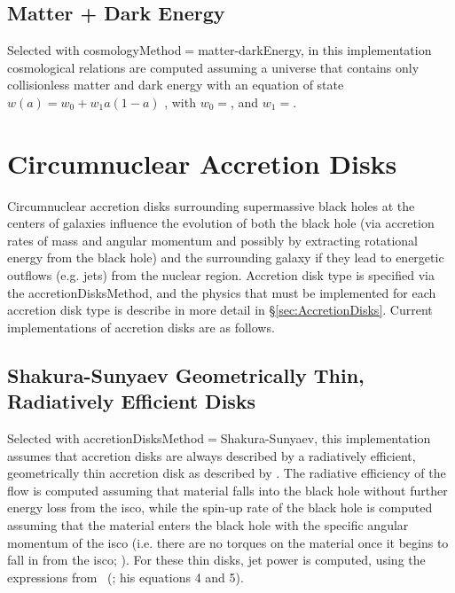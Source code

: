 \subsection{Matter + Dark Energy}\label{phys:cosmologyFunctions:cosmologyFunctionsMatterDarkEnergy}

Selected with {\normalfont \ttfamily cosmologyMethod}$=${\normalfont \ttfamily matter-darkEnergy}, in this implementation cosmological relations are computed assuming a universe that contains only collisionless matter and dark energy with an equation of state $w(a)=w_0+w_1a(1-a)$ \citep{jassal_wmap_2005}, with $w_0=${\normalfont \ttfamily [darkEnergyEquationOfStateW0]}, and $w_1=${\normalfont \ttfamily [darkEnergyEquationOfStateW1]}.

\section{Circumnuclear Accretion Disks}\label{sec:CircumnuclearDisks}

Circumnuclear accretion disks surrounding supermassive black holes at the centers of galaxies influence the evolution of both the black hole (via accretion rates of mass and angular momentum and possibly by extracting rotational energy from the black hole) and the surrounding galaxy if they lead to energetic outflows (e.g. jets) from the nuclear region. Accretion disk type is specified via the {\normalfont \ttfamily accretionDisksMethod}, and the physics that must be implemented for each accretion disk type is describe in more detail in \S\ref{sec:AccretionDisks}. Current implementations of accretion disks are as follows.

\subsection{Shakura-Sunyaev Geometrically Thin, Radiatively Efficient Disks}

Selected with {\normalfont \ttfamily accretionDisksMethod}$=${\normalfont \ttfamily Shakura-Sunyaev}, this implementation assumes that accretion disks are always described by a radiatively efficient, geometrically thin accretion disk as described by \cite{shakura_black_1973}. The radiative efficiency of the flow is computed assuming that material falls into the black hole without further energy loss from the \gls{isco}, while the spin-up rate of the black hole is computed assuming that the material enters the black hole with the specific angular momentum of the \gls{isco} (i.e. there are no torques on the material once it begins to fall in from the \gls{isco}; \citealt{bardeen_kerr_1970}). For these thin disks, jet power is computed, using the expressions from \citeauthor{meier_association_2001}~(\citeyear{meier_association_2001}; his equations 4 and 5).

